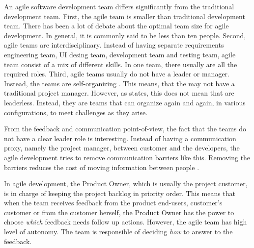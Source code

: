 \documentclass[english,12pt,a4paper,pdftex]{article}
\begin{document}
An agile software development team differs significantly from the traditional development team. First, the agile team is smaller than traditional development team. There has been a lot of debate about the optimal team size for agile development. In general, it is commonly said to be less than ten people. Second, agile teams are interdisciplinary. Instead of having separate requirements engineering team, \ac{UI} desing team, development team and testing team, agile team consist of a mix of different skills. In one team, there usually are all the required roles. Third, agile teams usually do not have a leader or manager. Instead, the teams are self-organizing \citep{cockburn2001}. This means, that the may not have a traditional project manager. However, as \citet{cockburn2001} states, this does not mean that are leaderless. Instead, they are teams that can organize again and again, in various configurations, to meet challenges as they arise.

From the feedback and communication point-of-view, the fact that the teams do not have a clear leader role is interesting. Instead of having a communication proxy, namely the project manager, between customer and the developers, the agile development tries to remove communication barriers like this. Removing the barriers reduces the cost of moving information between people \citep{cockburn2001}.

In agile development, the Product Owner, which is usually the project customer, is in charge of keeping the project backlog in priority order. This means that when the team receives feedback from the product end-users, customer's customer or from the customer herself, the Product Owner has the power to choose \emph{which} feedback needs follow up actions. However, the agile team has high level of autonomy. The team is responsible of deciding \emph{how} to answer to the feedback. 

\end{document}
